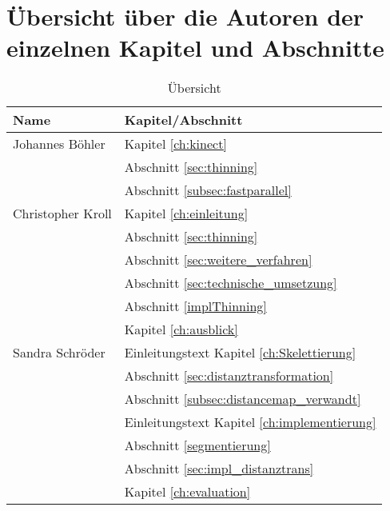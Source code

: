 \chapter{Übersicht über die Autoren der einzelnen Kapitel und Abschnitte}
\begin{table}[htbp]
\begin{center}
\begin{tabular}{|l|l|}
\hline 
\textbf{Name} & \textbf{Kapitel/Abschnitt}\\
\hline Johannes Böhler & Kapitel \ref{ch:kinect}\\
 & Abschnitt \ref{sec:thinning}\\
 & Abschnitt \ref{subsec:fastparallel} \\ 
\hline Christopher Kroll &  Kapitel \ref{ch:einleitung} \\
&  Abschnitt \ref{sec:thinning} \\
&  Abschnitt \ref{sec:weitere_verfahren} \\
&  Abschnitt \ref{sec:technische_umsetzung} \\
&  Abschnitt \ref{implThinning} \\ 
&  Kapitel \ref{ch:ausblick} \\
\hline Sandra Schröder & Einleitungstext Kapitel \ref{ch:Skelettierung} \\
&  Abschnitt \ref{sec:distanztransformation}\\
&  Abschnitt \ref{subsec:distancemap_verwandt} \\
& Einleitungstext Kapitel \ref{ch:implementierung}\\
& Abschnitt \ref{segmentierung}\\
& Abschnitt \ref{sec:impl_distanztrans} \\
& Kapitel \ref{ch:evaluation} \\
\hline
\end{tabular} 
\end{center}
\caption{Übersicht}
\end{table}